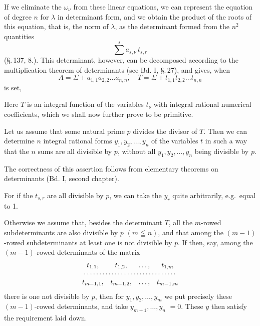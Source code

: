 
If we eliminate the $\omega_\nu$ from these linear equations, we
can represent the equation of degree $n$ for $\lambda$ in determinant
form, and we obtain the product of the roots of this equation,
that is, the norm of $\lambda$, as the determinant formed from
the $n^2$ quantities
\[
\sum^{s} a_{s,\nu}\,t_{s,r}
\]
(\S.\,137, 8.). This determinant, however, can be decomposed
according to the multiplication theorem of determinants
(see Bd. I, \S.\,27), and gives, when
\[
A = \Sigma \pm a_{1,1}a_{2,2}\ldots a_{n,n}, \quad T = \Sigma \pm t_{1,1}t_{2,2}\ldots t_{n,n}
\]
is set,

Here $T$ is an integral function of the variables $t_\nu$ with integral
rational numerical coefficients, which we shall now further
prove to be primitive.

Let us assume that some natural prime $p$ divides the
divisor of $T$. Then we can determine $n$ integral rational
forms $y_1, y_2, \ldots, y_n$ of the variables $t$ in such a way that the
$n$ sums
are all divisible by $p$, without all $y_1, y_2, \ldots, y_n$ being
divisible by $p$.

The correctness of this assertion follows from elementary
theorems on determinants (Bd. I, second chapter).

For if the $t_{s,r}$ are all divisible by $p$, we can take
the $y_r$ quite arbitrarily, e.g.\ equal to 1.

Otherwise we assume that, besides the determinant $T$,
all the $m$-rowed subdeterminants are also divisible by $p$
$(m \leqq n)$,
and that among the $(m-1)$-rowed subdeterminants
at least one is not divisible by $p$. If then,
say, among the $(m-1)$-rowed determinants of the matrix
\[
\begin{array}{cccc}
t_{1,1}, & t_{1,2}, & \ldots, & t_{1,m} \\
\multicolumn{4}{c}{\cdots\cdots\cdots\cdots\cdots\cdots\cdots\cdots\cdots\cdots} \\
t_{m-1,1}, & t_{m-1,2}, & \ldots, & t_{m-1,m}
\end{array}
\]
there is one not divisible by $p$, then for $y_1, y_2, \ldots, y_m$ we put
precisely these $(m-1)$-rowed determinants, and take $y_{m+1}, \ldots, y_n$
$= 0$. These $y$ then satisfy the requirement laid down.
